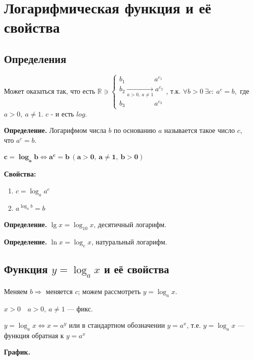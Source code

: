 \documentclass{article}
\begin{document}
    \section{Логарифмическая функция и её свойства}

    \subsection{Определения}

    Может оказаться так, что есть \( \mathbb{R} \ni \begin{cases} b_1\qquad\qquad\  a^{c_1}\\ b_2 \xrightarrow[a > 0,\ a \neq 1]{} a^{c_2}\\ b_3\qquad\qquad\  a^{c_3} \end{cases} \), т.к. \( \forall b > 0\ \exists c:\ a^c = b, \) где \( a > 0,\ a \neq 1 \). \( c \) - и есть \(log\).
    
    \textbf{Определение.} Логарифмом числа \(b\) по основанию \(a\) называется такое число \(c\), что \(a^c = b\).

    \(\mathbf{c = \log_a b \Leftrightarrow a^c = b\ (a > 0,\ a \neq 1,\ b > 0)}\)

    \textbf{Свойства:}
    \begin{enumerate}
        \item \(c = \log_a a^c\)
        \item \(a^{\log_a b} = b\)
    \end{enumerate}

    \textbf{Определение.} \(\lg x = \log_{10} x\), десятичный логарифм.
    
    \textbf{Определение.} \(\ln x = \log_e x\), натуральный логарифм.
    
    \subsection{Функция \(y = \log_a x\) и её свойства}
    
    Меняем \( b \Rightarrow \) меняется \(c\); можем рассмотреть \( y = \log_a x \). 

    \(x > 0\quad a > 0,\ a \neq 1\) --- фикс.

    \(y = \log_a x \Leftrightarrow x = a^y \) или в стандартном обозначении \(y = a^x\), т.е. \( y = \log_a x \) --- функция обратная к \( y = a^x \)
    
    \textbf{График.}
\end{document}
